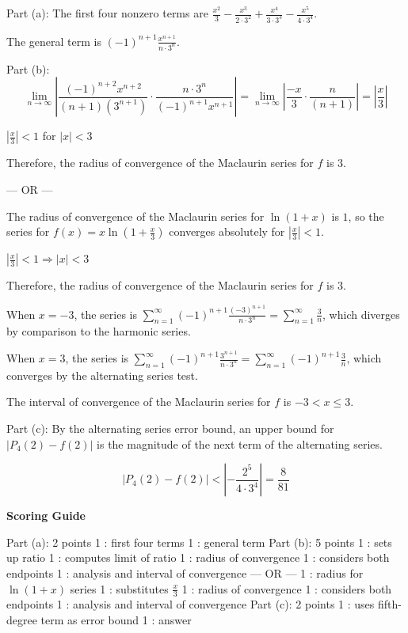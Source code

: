 \documentclass[12pt,addpoints,answers]{exam}
\begin{document}
\begin{questions}
\begin{solution}
Part (a): The first four nonzero terms are $\frac{x^2}{3} - \frac{x^3}{2 \cdot 3^2} + \frac{x^4}{3 \cdot 3^3} - \frac{x^5}{4 \cdot 3^4}$. \par The general term is $(-1)^{n+1} \frac{x^{n+1}}{n \cdot 3^n}$. \par Part (b): $$\lim_{n \to \infty} \left| \frac{(-1)^{n+2} x^{n+2}}{(n+1)(3^{n+1})} \cdot \frac{n \cdot 3^n}{(-1)^{n+1} x^{n+1}} \right| = \lim_{n \to \infty} \left| \frac{-x}{3} \cdot \frac{n}{(n+1)} \right| = \left| \frac{x}{3} \right|$$ \par $\left| \frac{x}{3} \right| < 1$ for $|x| < 3$ \par Therefore, the radius of convergence of the Maclaurin series for $f$ is $3$. \par — OR — \par The radius of convergence of the Maclaurin series for $\ln(1 + x)$ is $1$, so the series for $f(x) = x \ln\left(1 + \frac{x}{3}\right)$ converges absolutely for $\left| \frac{x}{3} \right| < 1$. \par $\left| \frac{x}{3} \right| < 1 \Rightarrow |x| < 3$ \par Therefore, the radius of convergence of the Maclaurin series for $f$ is $3$. \par When $x = -3$, the series is $\sum_{n=1}^{\infty} (-1)^{n+1} \frac{(-3)^{n+1}}{n \cdot 3^n} = \sum_{n=1}^{\infty} \frac{3}{n}$, which diverges by comparison to the harmonic series. \par When $x = 3$, the series is $\sum_{n=1}^{\infty} (-1)^{n+1} \frac{3^{n+1}}{n \cdot 3^n} = \sum_{n=1}^{\infty} (-1)^{n+1} \frac{3}{n}$, which converges by the alternating series test. \par The interval of convergence of the Maclaurin series for $f$ is $-3 < x \le 3$. \par Part (c): By the alternating series error bound, an upper bound for $|P_4(2) - f(2)|$ is the magnitude of the next term of the alternating series. \par $$|P_4(2) - f(2)| < \left| -\frac{2^5}{4 \cdot 3^4} \right| = \frac{8}{81}$$
\par\medskip
\textbf{Scoring Guide}\par
Part (a): 2 points 1 : first four terms 1 : general term Part (b): 5 points 1 : sets up ratio 1 : computes limit of ratio 1 : radius of convergence 1 : considers both endpoints 1 : analysis and interval of convergence — OR — 1 : radius for $\ln(1+x)$ series 1 : substitutes $\frac{x}{3}$ 1 : radius of convergence 1 : considers both endpoints 1 : analysis and interval of convergence Part (c): 2 points 1 : uses fifth-degree term as error bound 1 : answer
\end{solution}
\end{questions}
\end{document}
